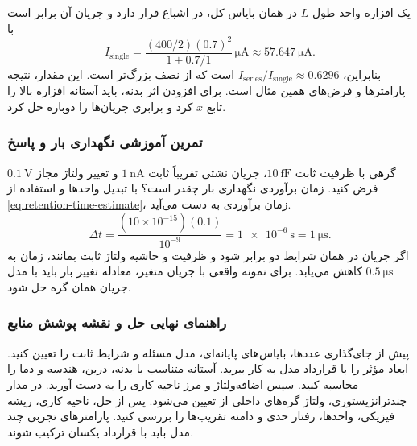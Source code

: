 یک افزاره واحد طول \(L\) در همان بایاس کل، در اشباع قرار دارد و
جریان آن برابر است با
\begin{equation*}
 I_{\mathrm{single}}=
 \frac{(400/2)(0.7)^2}{1+0.7/1}\,\unit{\micro\ampere}
 \approx\qty{57.647}{\micro\ampere}.
\end{equation*}
بنابراین، \(I_{\mathrm{series}}/I_{\mathrm{single}}\approx0.6296\)
است که از نصف بزرگ‌تر است. این مقدار، نتیجه پارامترها و فرض‌های
همین مثال است. برای افزودن اثر بدنه، باید آستانه افزاره بالا را
تابع \(x\) کرد و برابری جریان‌ها را دوباره حل کرد.

\subsubsection*{تمرین آموزشی نگهداری بار و پاسخ}
گرهی با ظرفیت ثابت \(\qty{10}{\femto\farad}\)، جریان نشتی تقریباً
ثابت \(\qty{1}{\nano\ampere}\) و تغییر ولتاژ مجاز
\(\qty{0.1}{\volt}\) فرض کنید. زمان برآوردی نگهداری بار چقدر است؟
با تبدیل واحدها و استفاده از \eqref{eq:retention-time-estimate}، زمان
برآوردی به دست می‌آید.
\[
 \Delta t=\frac{(10\times10^{-15})(0.1)}{10^{-9}}
 =\qty{1e-6}{\second}=\qty{1}{\micro\second}.
\]
اگر جریان در همان شرایط دو برابر شود و ظرفیت و حاشیه ولتاژ ثابت
بمانند، زمان به \(\qty{0.5}{\micro\second}\) کاهش می‌یابد.
برای نمونه واقعی با جریان متغیر، معادله تغییر بار باید با مدل
جریان همان گره حل شود.

\subsubsection*{راهنمای نهایی حل و نقشه پوشش منابع}
پیش از جای‌گذاری عددها، بایاس‌های پایانه‌ای، مدل مسئله و شرایط ثابت
را تعیین کنید. ابعاد مؤثر را با قرارداد مدل به کار ببرید. آستانه
متناسب با بدنه، درین، هندسه و دما را محاسبه کنید. سپس اضافه‌ولتاژ
و مرز ناحیه کاری را به دست آورید. در مدار چندترانزیستوری، ولتاژ
گره‌های داخلی از  تعیین می‌شود. پس از حل، ناحیه کاری،
ریشه فیزیکی، واحدها، رفتار حدی و دامنه تقریب‌ها را بررسی کنید.
پارامترهای تجربی چند مدل باید با قرارداد یکسان ترکیب شوند.

